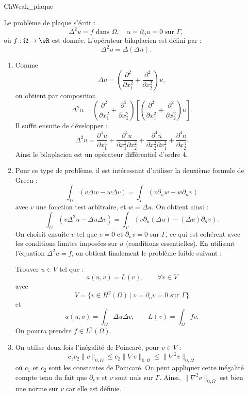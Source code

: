 \medskip

\begin{corrige}{ChWeak_plaque}

Le {problème de plaque} s'écrit :
\begin{equation*} %
\Delta^2 u = f \mbox{ dans } \Omega, \quad u = \partial_n u = 0 \mbox{ sur } \Gamma,
\end{equation*}
où $f : \Omega \rightarrow \eR$ est donnée. L'opérateur bilaplacien est défini par :
\[
\Delta^2 u = \Delta (\Delta u).
\]

\begin{enumerate}

\item Comme 
\[
\Delta u = \left ( \frac{\partial^2}{\partial x_1^2}
+ \frac{\partial^2}{\partial x_2^2} \right ) u,
\]
on obtient par composition
\[
\Delta^2 u = 
\left ( \frac{\partial^2}{\partial x_1^2}
+ \frac{\partial^2}{\partial x_2^2} \right ) 
\left [ \left ( \frac{\partial^2}{\partial x_1^2}
+ \frac{\partial^2}{\partial x_2^2} \right ) u
 \right ].
\]
Il suffit ensuite de développer :
\[
\Delta^2 u = 
\frac{\partial^4 u}{\partial x_1^4}
+ 
\frac{\partial^4 u}{\partial x_1^2 \partial x_2^2} 
+ 
\frac{\partial^4 u}{\partial x_2^2 \partial x_1^2}
+
\frac{\partial^4 u}{\partial x_2^4}.
\]
Ainsi le bilaplacien est un opérateur différentiel d'ordre 4.

\item Pour ce type de problème, il est intéressant d'utiliser la deuxième formule de Green : 
\[
\int_\Omega ( v \Delta w  - w \Delta v ) = 
\int_{\Gamma} ( v \partial_n w - w \partial_n v )
\]
avec $v$ une fonction test arbitraire, et $w=\Delta u$. On obtient ainsi :
\[
\int_\Omega ( v \Delta^2 u  - \Delta u \Delta v ) = 
\int_{\Gamma} ( v \partial_n (\Delta u) - (\Delta u) \partial_n v ).
\]
On choisit ensuite $v$ tel que $v=0$ et $\partial_n v = 0$ sur $\Gamma$, ce qui est cohérent avec les conditions limites imposées sur $u$ (conditions essentielles).
En utilisant l'équation $\Delta^2 u = f$, on obtient finalement le problème faible suivant :

\smallskip

Trouver $u \in V$ tel que :
\[
a(u,v) = L(v), \qquad \forall v \in V
\]
avec 
\[
V = \{ v \in H^2(\Omega) \: | \: v = \partial_n v = 0 \mbox{ sur } \Gamma \}
\]
et
\[
a(u,v) = \int_\Omega \Delta u \Delta v , \qquad L(v) = \int_\Omega f v.
\]
On pourra prendre $f \in L^2 (\Omega)$.

\item On utilise deux fois l'inégalité de Poincaré, pour $v \in V$ :
\[ 
c_1 c_2  \|  v \|_{0,\Omega} \leq c_2 \| \nabla v \|_{0,\Omega} \leq \| \nabla^2 v \|_{0,\Omega}
\]  
où $c_1$ et $c_2$ sont les constantes de Poincaré. On peut appliquer cette inégalité compte tenu du fait que $\partial_n v$ et $v$ sont nuls sur $\Gamma$. Ainsi, $ \| \nabla^2 v \|_{0,\Omega}$ est bien une norme sur $v$ car elle est définie.


\end{enumerate}
\end{corrige}
